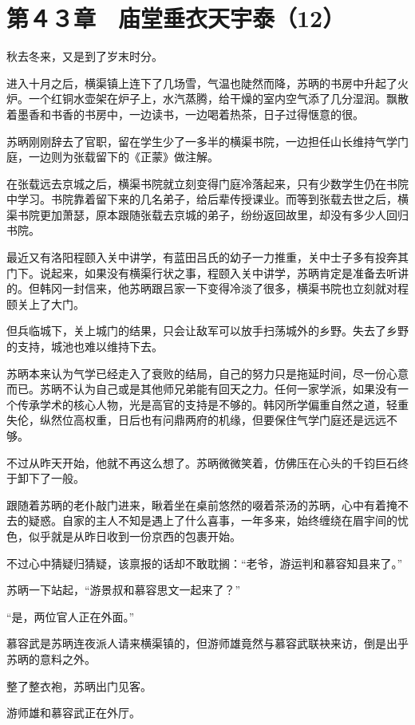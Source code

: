 \section{第４３章　庙堂垂衣天宇泰（12）}

秋去冬来，又是到了岁末时分。

进入十月之后，横渠镇上连下了几场雪，气温也陡然而降，苏昞的书房中升起了火炉。一个红铜水壶架在炉子上，水汽蒸腾，给干燥的室内空气添了几分湿润。飘散着墨香和书香的书房中，一边读书，一边喝着热茶，日子过得惬意的很。

苏昞刚刚辞去了官职，留在学生少了一多半的横渠书院，一边担任山长维持气学门庭，一边则为张载留下的《正蒙》做注解。

在张载远去京城之后，横渠书院就立刻变得门庭冷落起来，只有少数学生仍在书院中学习。书院靠着留下来的几名弟子，给后辈传授课业。而等到张载去世之后，横渠书院更加萧瑟，原本跟随张载去京城的弟子，纷纷返回故里，却没有多少人回归书院。

最近又有洛阳程颐入关中讲学，有蓝田吕氏的幼子一力推重，关中士子多有投奔其门下。说起来，如果没有横渠行状之事，程颐入关中讲学，苏昞肯定是准备去听讲的。但韩冈一封信来，他苏昞跟吕家一下变得冷淡了很多，横渠书院也立刻就对程颐关上了大门。

但兵临城下，关上城门的结果，只会让敌军可以放手扫荡城外的乡野。失去了乡野的支持，城池也难以维持下去。

苏昞本来认为气学已经走入了衰败的结局，自己的努力只是拖延时间，尽一份心意而已。苏昞不认为自己或是其他师兄弟能有回天之力。任何一家学派，如果没有一个传承学术的核心人物，光是高官的支持是不够的。韩冈所学偏重自然之道，轻重失伦，纵然位高权重，日后也有问鼎两府的机缘，但要保住气学门庭还是远远不够。

不过从昨天开始，他就不再这么想了。苏昞微微笑着，仿佛压在心头的千钧巨石终于卸下了一般。

跟随着苏昞的老仆敲门进来，瞅着坐在桌前悠然的啜着茶汤的苏昞，心中有着掩不去的疑惑。自家的主人不知是遇上了什么喜事，一年多来，始终缠绕在眉宇间的忧色，似乎就是从昨日收到一份京西的包裹开始。

不过心中猜疑归猜疑，该禀报的话却不敢耽搁：“老爷，游运判和慕容知县来了。”

苏昞一下站起，“游景叔和慕容思文一起来了？”

“是，两位官人正在外面。”

慕容武是苏昞连夜派人请来横渠镇的，但游师雄竟然与慕容武联袂来访，倒是出乎苏昞的意料之外。

整了整衣袍，苏昞出门见客。

游师雄和慕容武正在外厅。

